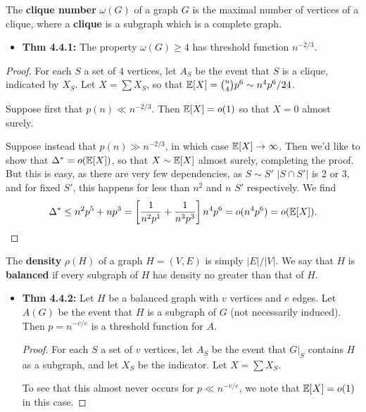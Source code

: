 \documentclass[11pt]{article}
\newenvironment{INT}[1][]{\begin{itemize}\small\item\textbf{#1}}{\end{itemize}}
\begin{document}
\begin{chapter4}
\begin{itemise}
The \textbf{clique number} $\omega(G)$ of a graph $G$ is the maximal number of vertices of a clique, where a \textbf{clique} is a subgraph which is a complete graph.
\begin{INT}[Thm 4.4.1:]
The property $\omega(G)\geq4$ has threshold function $n^{-2/3}$.
\end{INT}
\begin{proof}
For each $S$ a set of $4$ vertices, let $A_S$ be the event that $S$ is a clique, indicated by $X_S$. Let $X=\sum X_S$, so that $\operatorname{\mathbb{E}}[X]={n\choose 4}p^6\sim n^4p^6/24$.

\INDENT Suppose first that $p(n)\ll n^{-2/3}$. Then $\operatorname{\mathbb{E}}[X]=o(1)$ so that $X=0$ almost surely.

\INDENT Suppose instead that $p(n)\gg n^{-2/3}$, in which case $\operatorname{\mathbb{E}}[X]\rightarrow\infty$. Then we'd like to show that $\Delta^*=o(\operatorname{\mathbb{E}}[X])$, so that $X\sim \operatorname{\mathbb{E}}[X]$ almost surely, completing the proof. But this is easy, as there are very few dependencies, as $S\sim S'$ \Iff $|S\cap S'|$ is 2 or 3, and for fixed $S'$, this happens for less than $n^2$ and $n$ $S'$ respectively. We find
\[\Delta^*\leq n^2p^5+np^3=\left[\frac{1}{n^2p^1}+\frac{1}{n^3p^3}\right]n^4p^6=o(n^4p^6)=o(\operatorname{\mathbb{E}}[X]).\qedhere\]
\end{proof}
\item The \textbf{density} $\rho(H)$ of a graph $H=(V,E)$ is simply $|E|/|V|$. We say that $H$ is \textbf{balanced} if every subgraph of $H$ has density no greater than that of $H$.
\begin{INT}[Thm 4.4.2:]
Let $H$ be a balanced graph with $v$ vertices and $e$ edges. Let $A(G)$ be the event that $H$ is a subgraph of $G$ (not necessarily induced). Then $p=n^{-v/e}$ is a threshold function for $A$.
\begin{proof}
For each $S$ a set of $v$ vertices, let $A_S$ be the event that $G|_S$ contains $H$ as a subgraph, and let $X_S$ be the indicator. Let $X=\sum X_S$.

\INDENT To see that this almost never occurs for $p\ll n^{-v/e}$, we note that $\operatorname{\mathbb{E}}[X]=o(1)$ in this case.


\end{proof}
\end{INT}
\end{itemise}
\end{chapter4}
\end{document}
